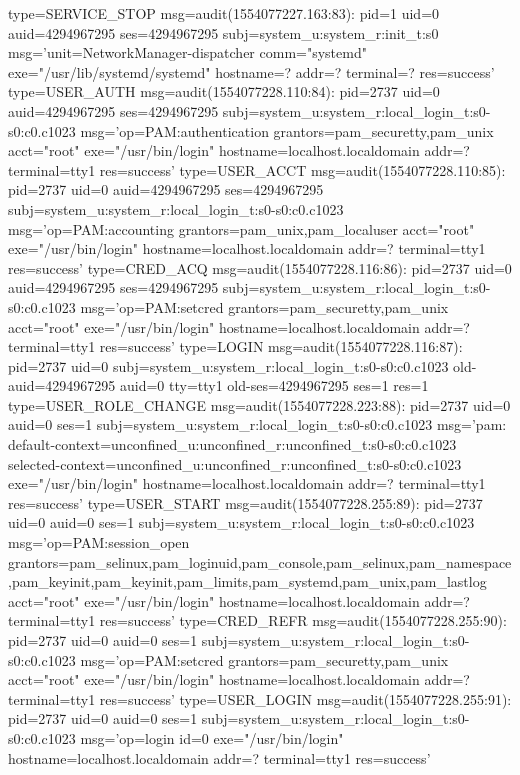\documentclass[]{report}
\newenvironment{Shaded}{}{}
\newcommand{\NormalTok}[1]{#1}
\begin{document}
\begin{Shaded}
\begin{Highlighting}[]
\NormalTok{type=SERVICE_STOP msg=audit(1554077227.163:83): pid=1 uid=0 auid=4294967295 ses=4294967295 subj=system_u:system_r:init_t:s0 msg='unit=NetworkManager-dispatcher comm="systemd" exe="/usr/lib/systemd/systemd" hostname=? addr=? terminal=? res=success'}
\NormalTok{type=USER_AUTH msg=audit(1554077228.110:84): pid=2737 uid=0 auid=4294967295 ses=4294967295 subj=system_u:system_r:local_login_t:s0-s0:c0.c1023 msg='op=PAM:authentication grantors=pam_securetty,pam_unix acct="root" exe="/usr/bin/login" hostname=localhost.localdomain addr=? terminal=tty1 res=success'}
\NormalTok{type=USER_ACCT msg=audit(1554077228.110:85): pid=2737 uid=0 auid=4294967295 ses=4294967295 subj=system_u:system_r:local_login_t:s0-s0:c0.c1023 msg='op=PAM:accounting grantors=pam_unix,pam_localuser acct="root" exe="/usr/bin/login" hostname=localhost.localdomain addr=? terminal=tty1 res=success'}
\NormalTok{type=CRED_ACQ msg=audit(1554077228.116:86): pid=2737 uid=0 auid=4294967295 ses=4294967295 subj=system_u:system_r:local_login_t:s0-s0:c0.c1023 msg='op=PAM:setcred grantors=pam_securetty,pam_unix acct="root" exe="/usr/bin/login" hostname=localhost.localdomain addr=? terminal=tty1 res=success'}
\NormalTok{type=LOGIN msg=audit(1554077228.116:87): pid=2737 uid=0 subj=system_u:system_r:local_login_t:s0-s0:c0.c1023 old-auid=4294967295 auid=0 tty=tty1 old-ses=4294967295 ses=1 res=1}
\NormalTok{type=USER_ROLE_CHANGE msg=audit(1554077228.223:88): pid=2737 uid=0 auid=0 ses=1 subj=system_u:system_r:local_login_t:s0-s0:c0.c1023 msg='pam: default-context=unconfined_u:unconfined_r:unconfined_t:s0-s0:c0.c1023 selected-context=unconfined_u:unconfined_r:unconfined_t:s0-s0:c0.c1023 exe="/usr/bin/login" hostname=localhost.localdomain addr=? terminal=tty1 res=success'}
\NormalTok{type=USER_START msg=audit(1554077228.255:89): pid=2737 uid=0 auid=0 ses=1 subj=system_u:system_r:local_login_t:s0-s0:c0.c1023 msg='op=PAM:session_open grantors=pam_selinux,pam_loginuid,pam_console,pam_selinux,pam_namespace,pam_keyinit,pam_keyinit,pam_limits,pam_systemd,pam_unix,pam_lastlog acct="root" exe="/usr/bin/login" hostname=localhost.localdomain addr=? terminal=tty1 res=success'}
\NormalTok{type=CRED_REFR msg=audit(1554077228.255:90): pid=2737 uid=0 auid=0 ses=1 subj=system_u:system_r:local_login_t:s0-s0:c0.c1023 msg='op=PAM:setcred grantors=pam_securetty,pam_unix acct="root" exe="/usr/bin/login" hostname=localhost.localdomain addr=? terminal=tty1 res=success'}
\NormalTok{type=USER_LOGIN msg=audit(1554077228.255:91): pid=2737 uid=0 auid=0 ses=1 subj=system_u:system_r:local_login_t:s0-s0:c0.c1023 msg='op=login id=0 exe="/usr/bin/login" hostname=localhost.localdomain addr=? terminal=tty1 res=success'}

\end{Highlighting}
\end{Shaded}
\end{document}
